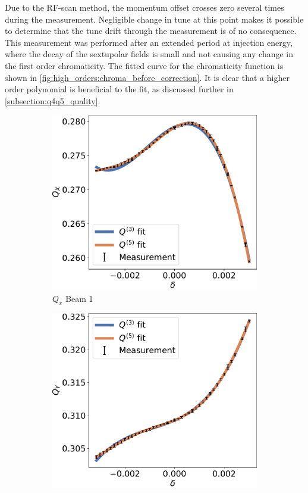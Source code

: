 Due to the RF-scan method, the momentum offset crosses zero several times during the measurement.
Negligible change in tune at this point makes it possible to determine that the tune drift through
the measurement is of no consequence.
This measurement was performed after an extended period at injection energy, where the decay of the
sextupolar fields is small and not causing any change in the first order chromaticity. The fitted
curve for the chromaticity function is shown in \cref{fig:high_orders:chroma_before_correction}. 
It is clear that a higher order polynomial is beneficial to the fit, as discussed further in
\cref{subsection:q4q5_quality}.

\begin{figure}[H]
    \begin{subfigure}{0.49\textwidth}
        \centering
        \includegraphics[width=\textwidth]{./images/higher_orders/fidel_chroma/Beam1_Qx.pdf}
        \caption{$Q_x$ Beam 1}
    \end{subfigure}
    \hfill
    \begin{subfigure}{0.49\textwidth}
        \centering
        \includegraphics[width=\textwidth]{./images/higher_orders/fidel_chroma/Beam1_Qy.pdf}

\end{subfigure}
\end{figure}

